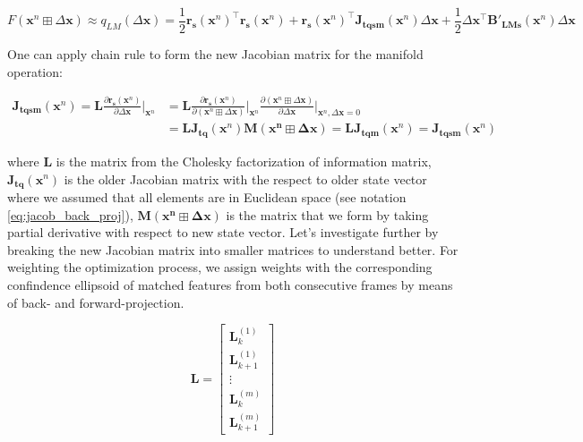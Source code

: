 \documentclass[a4paper]{report}
\numberwithin{figure}{section}
\begin{document}
\begin{appendices}
\begin{equation}
  F(\mathbf{x}^n \boxplus \Delta \mathbf{x}) \approx 
  q_{LM} (\Delta \mathbf{x}) = 
  \frac{1}{2}
\mathbf{r_s}(\mathbf{x}^n)^\top\mathbf{r_s}(\mathbf{x}^n) + 
\mathbf{r_s}(\mathbf{x}^n)^\top\mathbf{J_{tqsm}}(\mathbf{x}^n)\Delta 
\mathbf{x} + 
\frac{1}{2} \Delta \mathbf{x}^\top\mathbf{B'_{LMs}}(\mathbf{x}^n)\Delta 
\mathbf{x}
\end{equation}

One can apply chain rule to form the new Jacobian matrix for the manifold operation:

\begin{equation}
  \begin{aligned}
  \mathbf{J_{tqsm}}(\mathbf{x}^n) = 
  \mathbf{L} \frac{\partial \mathbf{r_s}(\mathbf{x}^n)}
  {\partial \Delta \mathbf{x}} \bigg|_{\mathbf{x}^n} & = 
  \mathbf{L} \frac{\partial \mathbf{r_s}(\mathbf{x}^n)}
{\partial (\mathbf{x}^n \boxplus \Delta \mathbf{x})} \bigg|_{\mathbf{x}^n}
  \frac{\partial (\mathbf{x}^n \boxplus \Delta \mathbf{x})}
  {\partial \Delta \mathbf{x}} \bigg|_{\mathbf{x}^n,\Delta \mathbf{x}=0} \\
  & = 
  \mathbf{L}\mathbf{J_{tq}}(\mathbf{x}^n) 
  \mathbf{M}(\mathbf{\mathbf{x}^n \boxplus \Delta \mathbf{x}})
  = 
  \mathbf{L}\mathbf{J_{tqm}}(\mathbf{x}^n)
  = 
  \mathbf{J_{tqsm}}(\mathbf{x}^n)
\end{aligned}
\end{equation}\label{eq:new_jacobian_chain_rule}

where $\mathbf{L}$ is the matrix from the Cholesky factorization of information matrix, 
$\mathbf{J_{tq}}(\mathbf{x}^n)$ is the older Jacobian matrix with the respect 
to 
older state vector where we assumed that all elements are in Euclidean space 
(see notation \eqref{eq:jacob_back_proj}), 
$\mathbf{M}(\mathbf{\mathbf{x}^n \boxplus \Delta \mathbf{x}})$ is the 
matrix that we form by taking partial derivative with respect to new state vector.
Let's investigate further by breaking the new Jacobian matrix into smaller matrices 
to understand better. For weighting the optimization process, 
we assign weights with the corresponding confindence ellipsoid of matched 
features 
from both consecutive frames by means of back- and forward-projection.

\begin{equation}
  \mathbf{L} 
  =
  \begin{bmatrix}
    \mathbf{L}^{(1)}_{k} \\
    \mathbf{L}^{(1)}_{k+1} \\
    \vdots \\
    \mathbf{L}^{(m)}_{k} \\
    \mathbf{L}^{(m)}_{k+1}
  \end{bmatrix}
\end{equation}


\end{appendices}
\end{document}
